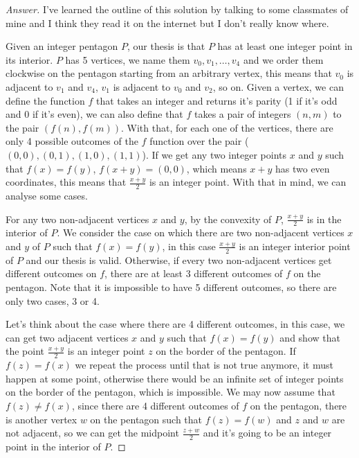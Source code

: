 \documentclass[12pt]{article}
\begin{document}
\begin{proof}[Answer]
I've learned the outline of this solution by talking to some classmates of mine and I think they read it on the internet but I don't really know where.  

Given an integer pentagon $P$, our thesis is that $P$ has at least one integer point in its interior. $P$ has 5 vertices, we name them $v_0, v_1, \dots, v_4$ and we order them clockwise on the pentagon starting from an arbitrary vertex, this means that $v_0$ is adjacent to $v_1$ and $v_4$, $v_1$ is adjacent to $v_0$ and $v_2$, so on. Given a vertex, we can define the function $f$ that takes an integer and returns it's parity (1 if it's odd and 0 if it's even), we can also define that $f$ takes a pair of integers $(n, m)$ to the pair $(f(n), f(m))$. With that, for each one of the vertices, there are only 4 possible outcomes of the $f$ function over the pair ($(0,0), (0,1), (1,0), (1,1)$). If we get any two integer points $x$ and $y$ such that $f(x) = f(y)$, $f(x + y) = (0, 0)$, which means $x+y$ has two even coordinates, this means that $\frac{x+y}{2}$ is an integer point. With that in mind, we can analyse some cases.  

For any two non-adjacent vertices $x$ and $y$, by the convexity of $P$, $\frac{x+y}{2}$ is in the interior of $P$. We consider the case on which there are two non-adjacent vertices $x$ and $y$ of $P$ such that $f(x) = f(y)$, in this case $\frac{x+y}{2}$ is an integer interior point of $P$ and our thesis is valid. Otherwise, if every two non-adjacent vertices get different outcomes on $f$, there are at least 3 different outcomes of $f$ on the pentagon. Note that it is impossible to have 5 different outcomes, so there are only two cases, 3 or 4.  

Let's think about the case where there are 4 different outcomes, in this case, we can get two adjacent vertices $x$ and $y$ such that $f(x) = f(y)$ and show that the point $\frac{x+y}{2}$ is an integer point $z$ on the border of the pentagon. If $f(z) = f(x)$ we repeat the process until that is not true anymore, it must happen at some point, otherwise there would be an infinite set of integer points on the border of the pentagon, which is impossible. We may now assume that $f(z) \neq f(x)$, since there are 4 different outcomes of $f$ on the pentagon, there is another vertex $w$ on the pentagon such that $f(z) = f(w)$ and $z$ and $w$ are not adjacent, so we can get the midpoint $\frac{z+w}{2}$ and it's going to be an integer point in the interior of $P$.  


\end{proof}
\end{document}
